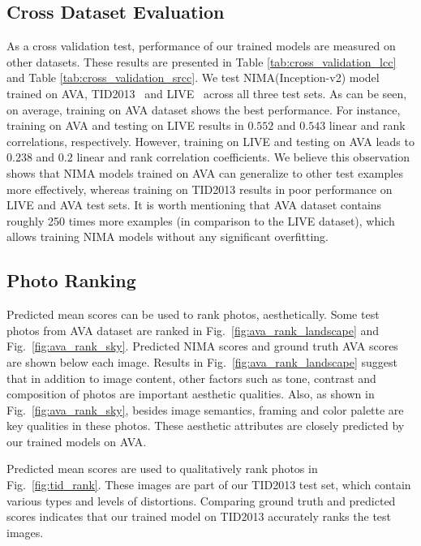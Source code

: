 \documentclass[10pt,twocolumn,twoside]{IEEEtran}
\begin{document}
\subsection{Cross Dataset Evaluation}
\label{sec:cross_dataset_eval}
\vspace{0 mm}

As a cross validation test, performance of our trained models are measured on other datasets. These results are presented in Table \ref{tab:cross_validation_lcc} and Table \ref{tab:cross_validation_srcc}. We test NIMA(Inception-v2) model trained on AVA, TID2013~\cite{ponomarenko2013color}  and LIVE~\cite{ghadiyaram2016massive} across all three test sets. As can be seen, on average, training on AVA dataset shows the best performance. For instance, training on AVA and testing on LIVE results in $0.552$ and $0.543$ linear and rank correlations, respectively. However, training on LIVE and testing on AVA leads to $0.238$ and $0.2$ linear and rank correlation coefficients. We believe this observation shows that NIMA models trained on AVA can generalize to other test examples more effectively, whereas training on TID2013 results in poor performance on LIVE and AVA test sets. It is worth mentioning that AVA dataset contains roughly 250 times more examples (in comparison to the LIVE dataset), which allows training NIMA models without any significant overfitting.

\subsection{Photo Ranking}
\label{sec:ranking}
\vspace{0 mm}

Predicted mean scores can be used to rank photos, aesthetically. Some test photos from AVA dataset are ranked in Fig.~\ref{fig:ava_rank_landscape} and Fig.~\ref{fig:ava_rank_sky}. Predicted NIMA scores and ground truth AVA scores are shown below each image. Results in Fig.~\ref{fig:ava_rank_landscape} suggest that in addition to image content, other factors such as tone, contrast and composition of photos are important aesthetic qualities. Also, as shown in Fig.~\ref{fig:ava_rank_sky}, besides image semantics, framing and color palette are key qualities in these photos. These aesthetic attributes are closely predicted by our trained models on AVA.

Predicted mean scores are used to qualitatively rank photos in Fig.~\ref{fig:tid_rank}. These images are part of our TID2013 test set, which contain various types and levels of distortions. Comparing ground truth and predicted scores indicates that our trained model on TID2013 accurately ranks the test images.
\end{document}
